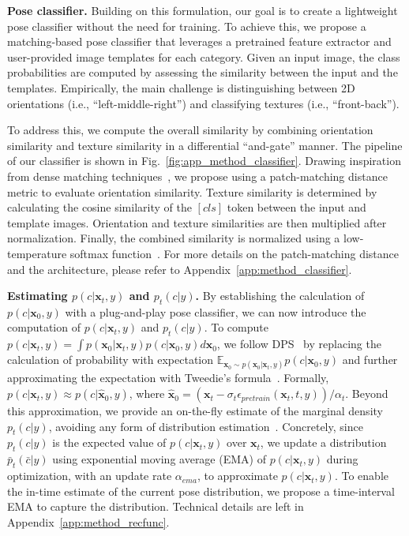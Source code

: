 \textbf{Pose classifier.} Building on this formulation, our goal is to create a lightweight pose classifier without the need for training. To achieve this, we propose a matching-based pose classifier that leverages a pretrained feature extractor and user-provided image templates for each category. Given an input image, the class probabilities are computed by assessing the similarity between the input and the templates. Empirically, the main challenge is distinguishing between 2D orientations (i.e., ``left-middle-right'') and classifying textures (i.e., ``front-back'').


To address this, we compute the overall similarity by combining orientation similarity and texture similarity in a differential ``and-gate'' manner. The pipeline of our classifier is shown in Fig.~\ref{fig:app_method_classifier}. Drawing inspiration from dense matching techniques~\citep{zhang2024telling, zhang2024tale}, we propose using a patch-matching distance metric to evaluate orientation similarity. Texture similarity is determined by calculating the cosine similarity of the $[cls]$ token between the input and template images. Orientation and texture similarities are then multiplied after normalization. Finally, the combined similarity is normalized using a low-temperature softmax function~\citep{goodfellow2016deep}. For more details on the patch-matching distance and the architecture, please refer to Appendix~\ref{app:method_classifier}.


\textbf{Estimating $p(c|\boldsymbol{x}_t, y)$ and $p_t(c|y)$.}
By establishing the calculation of $p(c|\boldsymbol{x}_0, y)$ with a plug-and-play pose classifier, we can now introduce the computation of $p(c | \boldsymbol{x}_t, y)$ and $p_t(c | y)$.
To compute $p(c | \boldsymbol{x}_t, y) = \int p(\boldsymbol{x}_0|\boldsymbol{x}_t,y) p(c|\boldsymbol{x}_0,y) d \boldsymbol{x}_0$, we follow DPS~\citep{chung2022diffusion} by replacing the calculation of probability with expectation $\mathbb{E}_{\boldsymbol{x}_0{\sim}p(\boldsymbol{x}_0|\boldsymbol{x}_t,y)}p(c|\boldsymbol{x}_0, y)$ and further approximating the expectation with Tweedie's formula~\citep{robbins1992empirical}. Formally, $p(c | \boldsymbol{x}_t, y)\approx p(c|\hat{\boldsymbol{x}}_0, y)$, where $\hat{\boldsymbol{x}}_0 = \left(\boldsymbol{x}_t-\sigma_t\epsilon_{pretrain}(\boldsymbol{x}_t, t, y)\right)/\alpha_t$. Beyond this approximation, we provide an on-the-fly estimate of the marginal density $p_t(c | y)$, avoiding any form of distribution estimation~\citep{robert1999monte}. Concretely, since $p_t(c | y)$ is the expected value of $p(c | \boldsymbol{x}_t, y)$ over $\boldsymbol{x}_t$, we update a distribution $\bar{p}_t(\bar{c} | y)$ using exponential moving average (EMA) of $p(c | \boldsymbol{x}_t, y)$ during optimization, with an update rate $\alpha_{ema}$, to approximate $p(c | \boldsymbol{x}_t, y)$. To enable the in-time estimate of the current pose distribution, we propose a time-interval EMA to capture the distribution. Technical details are left in Appendix~\ref{app:method_recfunc}.



